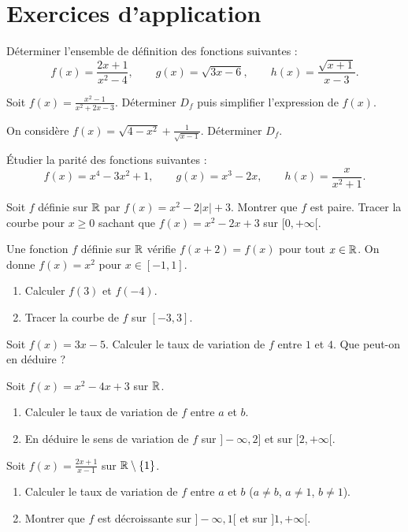 \section{Exercices d'application}


\exo{}
Déterminer l'ensemble de définition des fonctions suivantes :
\[
f(x)=\frac{2x+1}{x^2-4},\qquad g(x)=\sqrt{3x-6},\qquad h(x)=\frac{\sqrt{x+1}}{x-3}.
\]

\exo{}
Soit $f(x)=\frac{x^2-1}{x^2+2x-3}$. Déterminer $D_f$ puis simplifier l'expression de $f(x)$.

\exo{}
On considère $f(x)=\sqrt{4-x^2}+\frac{1}{\sqrt{x-1}}$. Déterminer $D_f$.


\exo{}
Étudier la parité des fonctions suivantes :
\[
f(x)=x^4-3x^2+1,\qquad g(x)=x^3-2x,\qquad h(x)=\frac{x}{x^2+1}.
\]

\exo{}
Soit $f$ définie sur $\mathbb{R}$ par $f(x)=x^2-2|x|+3$. Montrer que $f$ est paire. Tracer la courbe pour $x\ge 0$ sachant que $f(x)=x^2-2x+3$ sur $[0,+\infty[$.

\exo{}
Une fonction $f$ définie sur $\mathbb{R}$ vérifie $f(x+2)=f(x)$ pour tout $x\in\mathbb{R}$. On donne $f(x)=x^2$ pour $x\in[-1,1]$.
\begin{enumerate}[label=\alph*)]
\item Calculer $f(3)$ et $f(-4)$.
\item Tracer la courbe de $f$ sur $[-3,3]$.
\end{enumerate}


\exo{}
Soit $f(x)=3x-5$. Calculer le taux de variation de $f$ entre $1$ et $4$. Que peut-on en déduire ?

\exo{}
Soit $f(x)=x^2-4x+3$ sur $\mathbb{R}$.
\begin{enumerate}[label=\alph*)]
\item Calculer le taux de variation de $f$ entre $a$ et $b$.
\item En déduire le sens de variation de $f$ sur $]-\infty,2]$ et sur $[2,+\infty[$.
\end{enumerate}

\exo{}
Soit $f(x)=\frac{2x+1}{x-1}$ sur $\mathbb{R}\setminus\{1\}$.
\begin{enumerate}[label=\alph*)]
\item Calculer le taux de variation de $f$ entre $a$ et $b$ ($a\neq b$, $a\neq1$, $b\neq1$).
\item Montrer que $f$ est décroissante sur $]-\infty,1[$ et sur $]1,+\infty[$.
\end{enumerate}

